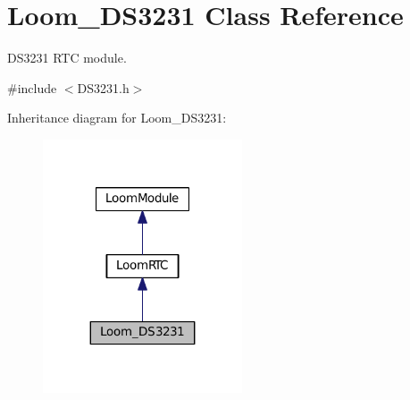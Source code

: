 \hypertarget{class_loom___d_s3231}{}\section{Loom\+\_\+\+D\+S3231 Class Reference}
\label{class_loom___d_s3231}


D\+S3231 R\+TC module.  




{\ttfamily \#include $<$D\+S3231.\+h$>$}



Inheritance diagram for Loom\+\_\+\+D\+S3231\+:\nopagebreak
\begin{figure}[H]
\begin{center}
\leavevmode
\includegraphics[width=167pt]{class_loom___d_s3231__inherit__graph}
\end{center}
\end{figure}
